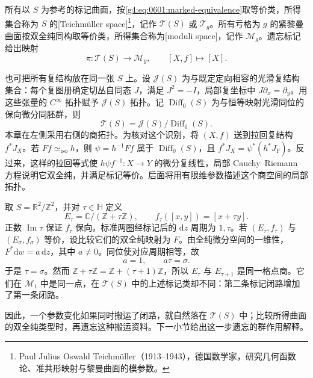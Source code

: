 \begin{definition}\label{g4:def:0601:teich-moduli}
	所有以 \(S\) 为参考的标记曲面，按\eqref{g4:eq:0601:marked-equivalence}取等价类，所得集合称为 \(S\) 的[Teichmüller space]\footnote{Paul Julius Oswald Teichmüller（1913--1943），德国数学家，研究几何函数论、准共形映射与黎曼曲面的模参数。}，记作 \(\mathcal T(S)\) 或 \(\mathcal T_g\)。所有亏格为 \(g\) 的紧黎曼曲面按双全纯同构取等价类，所得集合称为[moduli space]，记作 \(\mathcal M_g\)。遗忘标记给出映射
	\[
		\pi:\mathcal T(S)\longrightarrow\mathcal M_g,
		\qquad [X,f]\longmapsto[X].
	\]
\end{definition}

也可把所有复结构放在同一张 \(S\) 上。设 \(\mathcal J(S)\) 为与既定定向相容的光滑复结构集合：每个复图册确定切丛自同态 \(J\)，满足 \(J^2=-I\)，局部复坐标中 \(J\partial_x=\partial_y\)。用这些张量的 \(C^\infty\) 拓扑赋予 \(\mathcal J(S)\) 拓扑。记 \(\operatorname{Diff}_0(S)\) 为与恒等映射光滑同位的保向微分同胚群，则
\begin{equation}\label{g4:eq:0601:complex-structure-quotient}
	\mathcal T(S)=\mathcal J(S)/\operatorname{Diff}_0(S).
\end{equation}
本章在左侧采用右侧的商拓扑。为核对这个识别，将 \((X,f)\) 送到拉回复结构 \(f^*J_X\)。若 \(Ff\simeq_{\mathrm{iso}}h\)，则 \(\psi=h^{-1}Ff\) 属于 \(\operatorname{Diff}_0(S)\)，且 \(f^*J_X=\psi^*(h^*J_Y)\)。反过来，这样的拉回等式使 \(h\psi f^{-1}:X\to Y\) 的微分复线性，局部 Cauchy--Riemann 方程说明它双全纯，并满足标记等价。后面将用有限维参数描述这个商空间的局部拓扑。

\begin{example}\label{g4:exm:0601:marked-tori}
	取 \(S=\mathbb R^2/\mathbb Z^2\)，并对 \(\tau\in\mathbb H\) 定义
	\[
		E_\tau=\mathbb C/(\mathbb Z+\tau\mathbb Z),\qquad
		f_\tau([x,y])=[x+\tau y].
	\]
	正数 \(\operatorname{Im}\tau\) 保证 \(f_\tau\) 保向。标准两圈经标记后的 \(\mathrm{d}z\) 周期为 \(1,\tau\)。若 \((E_\tau,f_\tau)\) 与 \((E_\sigma,f_\sigma)\) 等价，设比较它们的双全纯映射为 \(F\)。由全纯微分空间的一维性，\(F^*\mathrm{d}w=a\,\mathrm{d}z\)，其中 \(a\ne0\)。同位使对应周期相等，故
	\[
		a=1,\qquad a\tau=\sigma.
	\]
	于是 \(\tau=\sigma\)。然而 \(\mathbb Z+\tau\mathbb Z=\mathbb Z+(\tau+1)\mathbb Z\)，所以 \(E_\tau\) 与 \(E_{\tau+1}\) 是同一格点商。它们在 \(\mathcal M_1\) 中是同一点，在 \(\mathcal T(S)\) 中的上述标记类却不同：第二条标记闭路增加了第一条闭路。
\end{example}

因此，一个参数变化如果同时搬运了闭路，就自然落在 \(\mathcal T(S)\) 中；比较所得曲面的双全纯类型时，再遗忘这种搬运资料。下一小节给出这一步遗忘的群作用解释。

